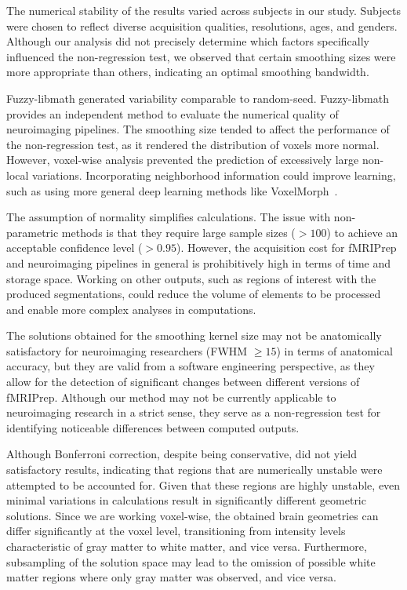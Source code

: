 \documentclass{article}
\newcommand{\fmriprep}{fMRIPrep\xspace}
\begin{document}
The numerical stability of the results varied across subjects in our study.
Subjects were chosen to reflect diverse acquisition qualities, resolutions,
ages, and genders. Although our analysis did not precisely determine which
factors specifically influenced the non-regression test, we observed that
certain smoothing sizes were more appropriate than others, indicating an optimal
smoothing bandwidth.

Fuzzy-libmath generated variability comparable to random-seed. Fuzzy-libmath
provides an independent method to evaluate the numerical quality of neuroimaging
pipelines. The smoothing size tended to affect the performance of the
non-regression test, as it rendered the distribution of voxels more normal.
However, voxel-wise analysis prevented the prediction of excessively large
non-local variations. Incorporating neighborhood information could improve
learning, such as using more general deep learning methods like
VoxelMorph~\cite{balakrishnan2019voxelmorph}.

The assumption of normality simplifies calculations. The issue with
non-parametric methods is that they require large sample sizes ($>100$) to achieve
an acceptable confidence level ($>0.95$). However, the acquisition cost for
\fmriprep and neuroimaging pipelines in general is prohibitively high in terms of
time and storage space. Working on other outputs, such as regions of interest
with the produced segmentations, could reduce the volume of elements to be
processed and enable more complex analyses in computations.

The solutions obtained for the smoothing kernel size may not be anatomically
satisfactory for neuroimaging researchers (FWHM $\geq 15$) in terms of anatomical
accuracy, but they are valid from a software engineering perspective, as they
allow for the detection of significant changes between different versions of
\fmriprep. Although our method may not be currently applicable to neuroimaging
research in a strict sense, they serve as a non-regression test for identifying
noticeable differences between computed outputs.

Although Bonferroni correction, despite being conservative, did not yield
satisfactory results, indicating that regions that are numerically unstable were
attempted to be accounted for. Given that these regions are highly unstable,
even minimal variations in calculations result in significantly different
geometric solutions. Since we are working voxel-wise, the obtained brain
geometries can differ significantly at the voxel level, transitioning from
intensity levels characteristic of gray matter to white matter, and vice versa.
Furthermore, subsampling of the solution space may lead to the omission of
possible white matter regions where only gray matter was observed, and vice
versa.
\end{document}

